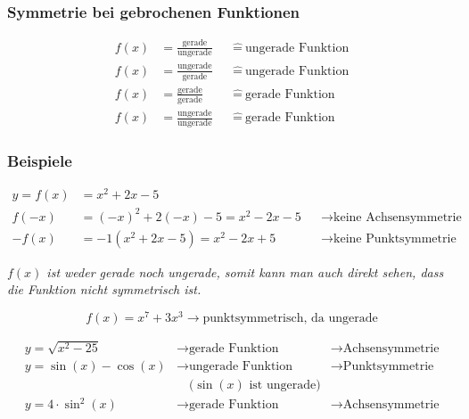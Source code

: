 \subsubsection{Symmetrie bei gebrochenen Funktionen}

\begin{align*}
    f(x) &= \frac{\text{gerade}}{\text{ungerade}} &&\hat{=}\ \text{ungerade Funktion} \\
    f(x) &= \frac{\text{ungerade}}{\text{gerade}} &&\hat{=}\ \text{ungerade Funktion} \\
    f(x) &= \frac{\text{gerade}}{\text{gerade}} &&\hat{=}\ \text{gerade Funktion} \\
    f(x) &= \frac{\text{ungerade}}{\text{ungerade}} &&\hat{=}\ \text{gerade Funktion}
\end{align*}

\subsubsection{Beispiele}

\begin{align*}
    y = f(x) &= x^2 + 2x - 5 \\
    f(-x) &= {(-x)}^2 + 2(-x) - 5 = x^2 - 2x - 5 &&\rightarrow \text{keine Achsensymmetrie} \\
    -f(x) &= -1(x^2 + 2x - 5) = x^2 - 2x +5 &&\rightarrow \text{keine Punktsymmetrie}
\end{align*}

\textit{\(f(x)\) ist weder gerade noch ungerade, somit kann man auch direkt sehen,
    dass die Funktion nicht symmetrisch ist.}


\[
    f(x) = x^7 + 3x^3 \rightarrow \text{punktsymmetrisch, da ungerade}
\]

\[
    \begin{array}{lll}
        y = \sqrt{x^2 - 25}   &\rightarrow \text{gerade Funktion} &\rightarrow \text{Achsensymmetrie} \\
        y = \sin(x) - \cos(x) &\rightarrow \text{ungerade Funktion} &\rightarrow \text{Punktsymmetrie} \\
        & \quad\text{(\(\sin(x)\) ist ungerade)} & \\
        y = 4 \cdot \sin^2(x) &\rightarrow \text{gerade Funktion} &\rightarrow \text{Achsensymmetrie}
    \end{array}        
\]


